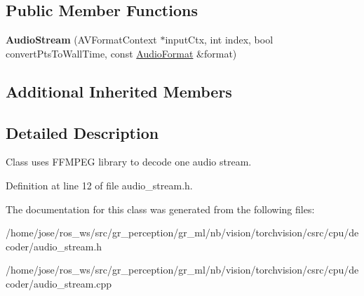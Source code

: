 \subsection*{Public Member Functions}
\begin{DoxyCompactItemize}
\item 
\mbox{\label{classffmpeg_1_1AudioStream_a66445b51a0f02d98ce323e0f0ec4c861}} 
{\bfseries Audio\+Stream} (A\+V\+Format\+Context $\ast$input\+Ctx, int index, bool convert\+Pts\+To\+Wall\+Time, const \hyperlink{structffmpeg_1_1AudioFormat}{Audio\+Format} \&format)
\end{DoxyCompactItemize}
\subsection*{Additional Inherited Members}


\subsection{Detailed Description}
Class uses F\+F\+M\+P\+EG library to decode one audio stream. 

Definition at line 12 of file audio\+\_\+stream.\+h.



The documentation for this class was generated from the following files\+:\begin{DoxyCompactItemize}
\item 
/home/jose/ros\+\_\+ws/src/gr\+\_\+perception/gr\+\_\+ml/nb/vision/torchvision/csrc/cpu/decoder/audio\+\_\+stream.\+h\item 
/home/jose/ros\+\_\+ws/src/gr\+\_\+perception/gr\+\_\+ml/nb/vision/torchvision/csrc/cpu/decoder/audio\+\_\+stream.\+cpp\end{DoxyCompactItemize}

